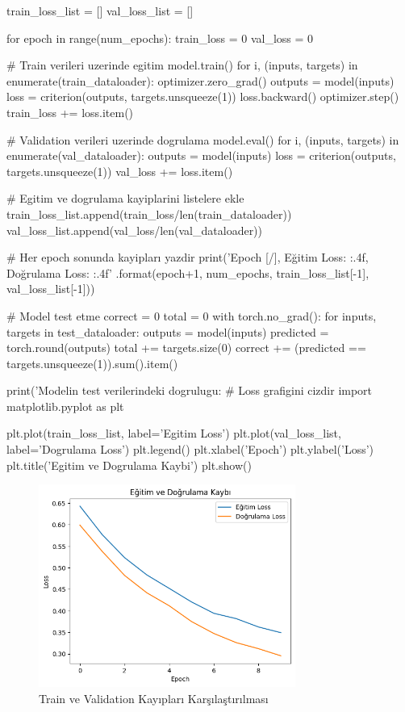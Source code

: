 \documentclass[11pt]{article}
\begin{document}
\begin{python}
train_loss_list = []
val_loss_list = []


for epoch in range(num_epochs):
    train_loss = 0
    val_loss = 0
    
    # Train verileri uzerinde egitim
    model.train()
    for i, (inputs, targets) in enumerate(train_dataloader):
        optimizer.zero_grad()
        outputs = model(inputs)
        loss = criterion(outputs, targets.unsqueeze(1))
        loss.backward()
        optimizer.step()
        train_loss += loss.item()
    
    # Validation verileri uzerinde dogrulama
    model.eval()
    for i, (inputs, targets) in enumerate(val_dataloader):
        outputs = model(inputs)
        loss = criterion(outputs, targets.unsqueeze(1))
        val_loss += loss.item()
    
    # Egitim ve dogrulama kayiplarini listelere ekle
    train_loss_list.append(train_loss/len(train_dataloader))
    val_loss_list.append(val_loss/len(val_dataloader))
    
    # Her epoch sonunda kayipları yazdir
    print('Epoch [{}/{}], Eğitim Loss: {:.4f}, Doğrulama Loss: {:.4f}'
          .format(epoch+1, num_epochs, train_loss_list[-1], val_loss_list[-1]))
          
# Model test etme
correct = 0
total = 0
with torch.no_grad():
    for inputs, targets in test_dataloader:
        outputs = model(inputs)
        predicted = torch.round(outputs)
        total += targets.size(0)
        correct += (predicted == targets.unsqueeze(1)).sum().item()

print('Modelin test verilerindeki dogrulugu: %
# Loss grafigini cizdir
import matplotlib.pyplot as plt

plt.plot(train_loss_list, label='Egitim Loss')
plt.plot(val_loss_list, label='Dogrulama Loss')
plt.legend()
plt.xlabel('Epoch')
plt.ylabel('Loss')
plt.title('Egitim ve Dogrulama Kaybi')
plt.show()

\end{python}

\begin{figure}[ht!]
    \centering
    \includegraphics[width=0.75\textwidth]{OUTPUT.png}
    \caption{Train ve Validation Kayıpları Karşılaştırılması}
    \label{fig:output}
\end{figure}
\end{document}
